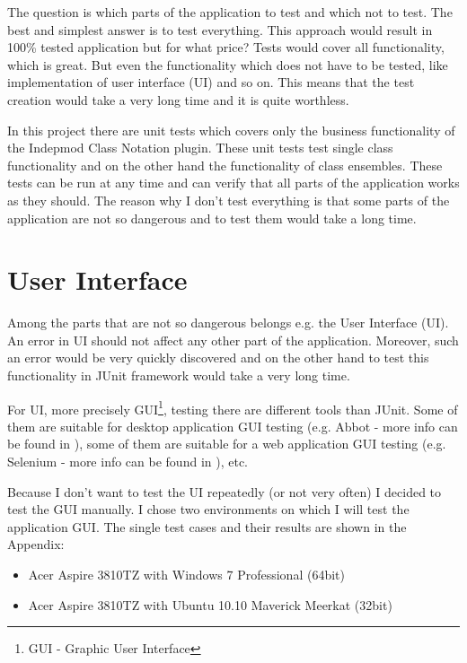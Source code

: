 The question is which parts of the application to test and which not to test. The best and simplest answer is to test everything. This approach would result in 100\% tested application but for what price? Tests would cover all functionality, which is great. But even the functionality which does not have to be tested, like implementation of user interface (UI) and so on. This means that the test creation would take a very long time and it is quite worthless.

In this project there are unit tests which covers only the business functionality of the Indepmod Class Notation plugin. These unit tests test single class functionality and on the other hand the functionality of class ensembles. These tests can be run at any time and can verify that all parts of the application works as they should. The reason why I don't test everything is that some parts of the application are not so dangerous and to test them would take a long time. 

\section{User Interface}

Among the parts that are not so dangerous belongs e.g. the User Interface (UI). An error in UI should not affect any other part of the application. Moreover, such an error would be very quickly discovered and on the other hand  to test this functionality in JUnit framework would take a very long time.

For UI, more precisely GUI\footnote{GUI - Graphic User Interface}, testing there are different tools than JUnit. Some of them are suitable for desktop application GUI testing (e.g. Abbot - more info can be found in \cite{AbbotWeb}), some of them are suitable for a web application GUI testing (e.g. Selenium - more info can be found in \cite{SeleniumWeb}), etc. 

Because I don't want to test the UI repeatedly (or not very often) I decided to test the GUI manually. I chose two environments on which I will test the application GUI. The single test cases and their results are shown in the Appendix:

\begin{itemize}
    \item Acer Aspire 3810TZ with Windows 7 Professional (64bit)
    \item Acer Aspire 3810TZ with Ubuntu 10.10 Maverick Meerkat (32bit)
\end{itemize}
